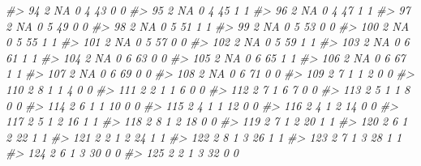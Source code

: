 \documentclass[]{book}
\newenvironment{Shaded}{\begin{snugshade}}{\end{snugshade}}
\newcommand{\CommentTok}[1]{\textcolor[rgb]{0.56,0.35,0.01}{\textit{#1}}}
\begin{document}
\begin{Shaded}
\begin{Highlighting}[]
\CommentTok{#> 94      2        NA         0     4    43           0            0}
\CommentTok{#> 95      2        NA         0     4    45           1            1}
\CommentTok{#> 96      2        NA         0     4    47           1            1}
\CommentTok{#> 97      2        NA         0     5    49           0            0}
\CommentTok{#> 98      2        NA         0     5    51           1            1}
\CommentTok{#> 99      2        NA         0     5    53           0            0}
\CommentTok{#> 100     2        NA         0     5    55           1            1}
\CommentTok{#> 101     2        NA         0     5    57           0            0}
\CommentTok{#> 102     2        NA         0     5    59           1            1}
\CommentTok{#> 103     2        NA         0     6    61           1            1}
\CommentTok{#> 104     2        NA         0     6    63           0            0}
\CommentTok{#> 105     2        NA         0     6    65           1            1}
\CommentTok{#> 106     2        NA         0     6    67           1            1}
\CommentTok{#> 107     2        NA         0     6    69           0            0}
\CommentTok{#> 108     2        NA         0     6    71           0            0}
\CommentTok{#> 109     2         7         1     1     2           0            0}
\CommentTok{#> 110     2         8         1     1     4           0            0}
\CommentTok{#> 111     2         2         1     1     6           0            0}
\CommentTok{#> 112     2         7         1     6     7           0            0}
\CommentTok{#> 113     2         5         1     1     8           0            0}
\CommentTok{#> 114     2         6         1     1    10           0            0}
\CommentTok{#> 115     2         4         1     1    12           0            0}
\CommentTok{#> 116     2         4         1     2    14           0            0}
\CommentTok{#> 117     2         5         1     2    16           1            1}
\CommentTok{#> 118     2         8         1     2    18           0            0}
\CommentTok{#> 119     2         7         1     2    20           1            1}
\CommentTok{#> 120     2         6         1     2    22           1            1}
\CommentTok{#> 121     2         2         1     2    24           1            1}
\CommentTok{#> 122     2         8         1     3    26           1            1}
\CommentTok{#> 123     2         7         1     3    28           1            1}
\CommentTok{#> 124     2         6         1     3    30           0            0}
\CommentTok{#> 125     2         2         1     3    32           0            0}

\end{Highlighting}
\end{Shaded}
\end{document}
